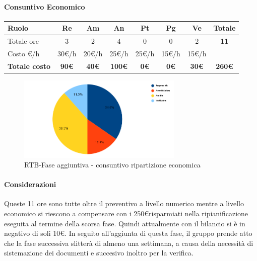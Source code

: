 \paragraph{Consuntivo Economico}
\begin{center}
	\renewcommand{\arraystretch}{1.8}
	\begin{tabular}{ |m{6em}|c|c|c|c|c|c|c| }
	\hline
	\textbf{Ruolo} & \textbf{Re} & \textbf{Am} &  \textbf{An} &  \textbf{Pt} &  \textbf{Pg} &  \textbf{Ve} &  \textbf{Totale}\\
    \hline
    Totale ore & 3 & 2 & 4 & 0 & 0 & 2 & \textbf{11}\\
    \hline
    Costo \euro/h & 30\euro/h & 20\euro/h & 25\euro/h & 25\euro/h & 15\euro/h & 15\euro/h & \\
    \hline
    \textbf{Totale costo} & \textbf{90\euro} & \textbf{40\euro} &  \textbf{100\euro} &  \textbf{0\euro} &  \textbf{0\euro} &  \textbf{30\euro} &  \textbf{260\euro}\\
    \hline
	\end{tabular}
    \begin{figure}[H]
        \centering\includegraphics[width=0.7\textwidth, height=0.7\textheight, keepaspectratio]{images/consuntivo/RTB-fase-aggiuntiva-costo.png}
        \caption{RTB-Fase aggiuntiva - consuntivo ripartizione economica}
    \end{figure}
\end{center}

\paragraph{Considerazioni} \hfill \break
Queste 11 ore sono tutte oltre il preventivo a livello numerico mentre a livello economico si riescono a compensare con i 250\euro risparmiati nella ripianificazione eseguita al termine della scorsa fase.
Quindi attualmente con il bilancio si è in negativo di soli 10\euro. 
\newline In seguito all'aggiunta di questa fase, il gruppo prende atto che la fase successiva slitterà di almeno una settimana, a causa della necessità di sistemazione dei documenti e succesivo inoltro per la verifica. 
